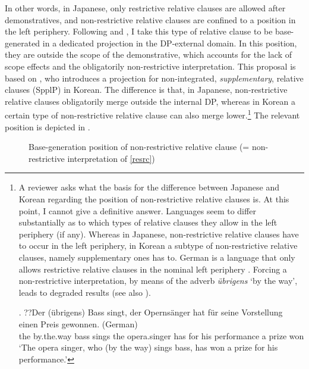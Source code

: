 \newpage
In other words, in Japanese, only restrictive relative clauses are allowed after demonstratives, and non-restrictive relative clauses are confined to a position in the left periphery. Following \citet{ishizuka:2008:RC} and \citet{cinque:2008:two}, I take this type of relative clause to be base-generated in a dedicated projection in the DP-external domain. In this position, they are outside the scope of the demonstrative, which accounts for the lack of scope effects and the obligatorily non-restrictive interpretation. This proposal is based on \citet{kim:2019:syntax}, who introduces a projection for non-integrated, \textit{supplementary}, relative clauses (SpplP) in Korean. The difference is that, in Japanese, non-restrictive relative clauses obligatorily merge outside the internal DP, whereas in Korean a certain type of non-restrictive relative clause can also merge lower.\footnote{A reviewer asks what the basis for the difference between Japanese and Korean regarding the position of non-restrictive relative clauses is.\label{footnote German RC} At this point, I cannot give a definitive answer. Languages seem to differ substantially as to which types of relative clauses they allow in the left periphery (if any). Whereas in Japanese, non-restrictive relative clauses have to occur in the left periphery, in Korean a subtype of non-restrictive relative clauses, namely supplementary ones has to. German is a language that only allows restrictive relative clauses in the nominal left periphery \citep{kohlich:2026:ms}. Forcing a non-restrictive interpretation, by means of the adverb \textit{übrigens} `by the way', leads to degraded results (see also \citealt{bhatt:1990:syntaktisch, roehrs:2019:left}).

\par

\exg. ??Der (übrigens) Bass singt, der Opernsänger hat für seine Vorstellung einen Preis gewonnen. (German)\\
the by.the.way bass sings the opera.singer has for his performance a prize won\\
`The opera singer, who (by the way) sings bass, has won a prize for his performance.’

}  The relevant position is depicted in .

\begin{figure}
\centering
\caption{Base-generation position of non-restrictive relative clause (= non-restrictive interpretation of \ref{resrc})}
\label{Non-restrictive Rc above demonstrative}
\end{figure}

